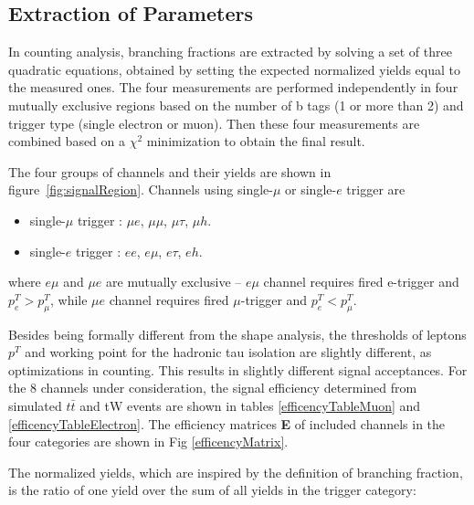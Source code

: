 
\FloatBarrier



\subsection{Extraction of Parameters}

In counting analysis, branching fractions are extracted by solving a set of
three quadratic equations, obtained by setting the expected normalized
yields equal to the measured ones. The four measurements are performed independently 
in four mutually exclusive regions based on the number of b tags (1 or more than 2) 
and trigger type (single electron or muon). Then these four measurements are combined based 
on a $\chi^{2}$ minimization to obtain the final result.

The four groups of channels and their yields
are shown in figure~\ref{fig:signalRegion}.
Channels using single-$\mu$ or single-$e$ trigger are

\begin{itemize}
    \item single-$\mu$ trigger : $\mu e$, $\mu\mu$, $\mu\tau$, $\mu h$.
    \item single-$e$ trigger : $ee$, $e\mu$, $e\tau$, $eh$.
\end{itemize}

where $e\mu$ and $\mu e$ are mutually exclusive -- $e\mu$ channel
requires fired e-trigger and \(p^T_e > p^T_\mu\), while $\mu e$ channel
requires fired $\mu$-trigger and \(p^T_e < p^T_\mu\). 

Besides being formally different from the shape analysis, the thresholds
of leptons $p^T$ and working point for the hadronic tau isolation are
slightly different, as optimizations in counting. This results in slightly different signal
acceptances. For the 8 channels under consideration, the signal efficiency determined from
simulated $t\bar{t}$ and tW events are shown in
tables \ref{efficencyTableMuon} and \ref{efficencyTableElectron}. 
The efficiency matrices \textbf{E} of 
included channels in the four categories are shown in Fig \ref{efficencyMatrix}.



The normalized yields, which are inspired by the definition of branching
fraction, is the ratio of one yield over the sum of all yields in the
trigger category:


